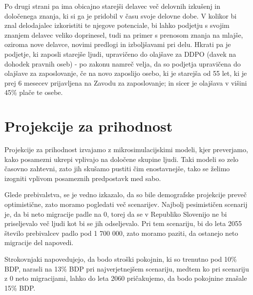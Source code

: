 \documentclass[12pt, a4paper]{article}
\begin{document}
\hspace*{5mm} Po drugi strani pa ima obicajno starejši delavec več delovnih izkušenj in določenega znanja, ki si ga je pridobil v času svoje delovne dobe. V kolikor bi znal delodajalec izkoristiti te njegove potenciale, bi lahko podjetju s svojim znanjem delavec veliko doprinesel, tudi na primer s prenosom znanja na mlajše, oziroma nove delavce, novimi predlogi in izboljšavami pri delu. Hkrati pa je podjetje, ki zaposli starejše ljudi, upravičeno do olajšave za DDPO (davek na dohodek pravnih oseb) - po zakonu namreč velja, da so podjetja upravičena do olajšave za zaposlovanje, če na novo zaposlijo osebo, ki je starejša od 55 let, ki je prej 6 mesecev prijavljena na Zavodu za zaposlovanje; in sicer je olajšava v višini 45\% plače te osebe. 


\newpage

\section[Projekcije za prihodnost]{Projekcije za prihodnost}

Projekcije za prihodnost izvajamo z mikrosimulacijskimi modeli, kjer preverjamo, kako posamezni ukrepi vplivajo na določene skupine ljudi. Taki modeli so zelo časovno zahtevni, zato jih skušamo pustiti čim enostavnejše, tako se želimo izogniti vplivom posameznih predpostavk med sabo.

\hspace*{5mm} Glede prebivalstva, se je vedno izkazalo, da so bile demografske projekcije preveč optimistične, zato moramo pogledati več scenarijev. Najbolj pesimističen scenarij je, da bi neto migracije padle na 0, torej da se v Republiko Slovenijo ne bi priseljevalo več ljudi kot bi se jih odseljevalo. Pri tem scenariju, bi do leta 2055 število prebivalcev padlo pod 1 700 000, zato moramo paziti, da ostanejo neto migracije del napovedi.

\hspace*{5mm} Strokovnjaki napovedujejo, da bodo stroški pokojnin, ki so trenutno pod 10\% BDP, narasli na 13\% BDP pri najverjetnejšem scenariju, medtem ko pri scenariju z 0 neto migracijami, lahko do leta 2060 pričakujemo, da bodo pokojnine znašale 15\% BDP.

\newpage
\end{document}
